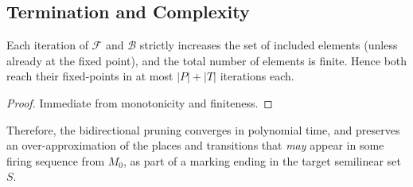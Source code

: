 \subsection{Termination and Complexity}

\begin{lemma}
	Each iteration of $\mathcal{F}$ and $\mathcal{B}$ strictly increases
	the set of included elements (unless already at the fixed point), and
	the total number of elements is finite.  Hence both reach their
	fixed-points in at most $|P|+|T|$ iterations each.
\end{lemma}

\begin{proof}
	Immediate from monotonicity and finiteness.
\end{proof}

\noindent
Therefore, the bidirectional pruning converges in polynomial time, and preserves an over-approximation of the
places and transitions that \emph{may} appear in some firing sequence from
$M_0$, as part of a marking ending in the target semilinear set $S$.






